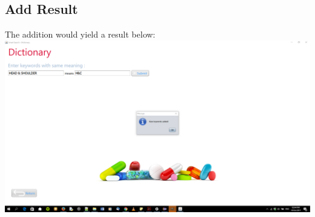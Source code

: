 \documentclass[a4paper,10pt]{article}
\begin{document}
	\subsection{Add Result}
	The addition would yield a result below: \\
	{\centering\includegraphics[width=15cm, scale=0.5]{5.png}} \\ \\
\end{document}
